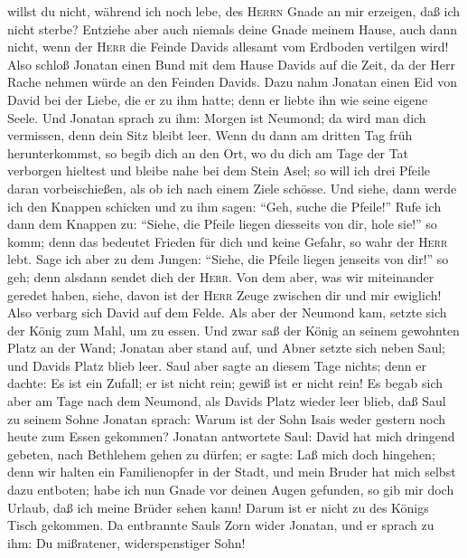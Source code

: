 willst du nicht, während ich noch lebe, des \textsc{Herrn} Gnade an mir
erzeigen, daß ich nicht sterbe?  Entziehe aber auch
niemals deine Gnade meinem Hause, auch dann nicht, wenn der
\textsc{Herr} die Feinde Davids allesamt vom Erdboden vertilgen wird!
 Also schloß Jonatan einen Bund mit dem Hause Davids auf
die Zeit, da der Herr Rache nehmen würde an den Feinden Davids.
 Dazu nahm Jonatan einen Eid von David bei der Liebe, die
er zu ihm hatte; denn er liebte ihn wie seine eigene Seele.
 Und Jonatan sprach zu ihm: Morgen ist Neumond; da wird
man dich vermissen, denn dein Sitz bleibt leer.  Wenn du
dann am dritten Tag früh herunterkommst, so begib dich an den Ort, wo du
dich am Tage der Tat verborgen hieltest und bleibe nahe bei dem Stein
Asel;  so will ich drei Pfeile daran vorbeischießen, als
ob ich nach einem Ziele schösse.  Und siehe, dann werde
ich den Knappen schicken und zu ihm sagen: ``Geh, suche die Pfeile!''
Rufe ich dann dem Knappen zu: ``Siehe, die Pfeile liegen diesseits von
dir, hole sie!'' so komm; denn das bedeutet Frieden für dich und keine
Gefahr, so wahr der \textsc{Herr} lebt.  Sage ich aber zu
dem Jungen: ``Siehe, die Pfeile liegen jenseits von dir!'' so geh; denn
alsdann sendet dich der \textsc{Herr}.  Von dem aber, was
wir miteinander geredet haben, siehe, davon ist der \textsc{Herr} Zeuge
zwischen dir und mir ewiglich!  Also verbarg sich David
auf dem Felde. Als aber der Neumond kam, setzte sich der König zum Mahl,
um zu essen.  Und zwar saß der König an seinem gewohnten
Platz an der Wand; Jonatan aber stand auf, und Abner setzte sich neben
Saul; und Davids Platz blieb leer.  Saul aber sagte an
diesem Tage nichts; denn er dachte: Es ist ein Zufall; er ist nicht
rein; gewiß ist er nicht rein!  Es begab sich aber am
Tage nach dem Neumond, als Davids Platz wieder leer blieb, daß Saul zu
seinem Sohne Jonatan sprach: Warum ist der Sohn Isais weder gestern noch
heute zum Essen gekommen?  Jonatan antwortete Saul: David
hat mich dringend gebeten, nach Bethlehem gehen zu dürfen;
 er sagte: Laß mich doch hingehen; denn wir halten ein
Familienopfer in der Stadt, und mein Bruder hat mich selbst dazu
entboten; habe ich nun Gnade vor deinen Augen gefunden, so gib mir doch
Urlaub, daß ich meine Brüder sehen kann! Darum ist er nicht zu des
Königs Tisch gekommen.  Da entbrannte Sauls Zorn wider
Jonatan, und er sprach zu ihm: Du mißratener, widerspenstiger Sohn!
